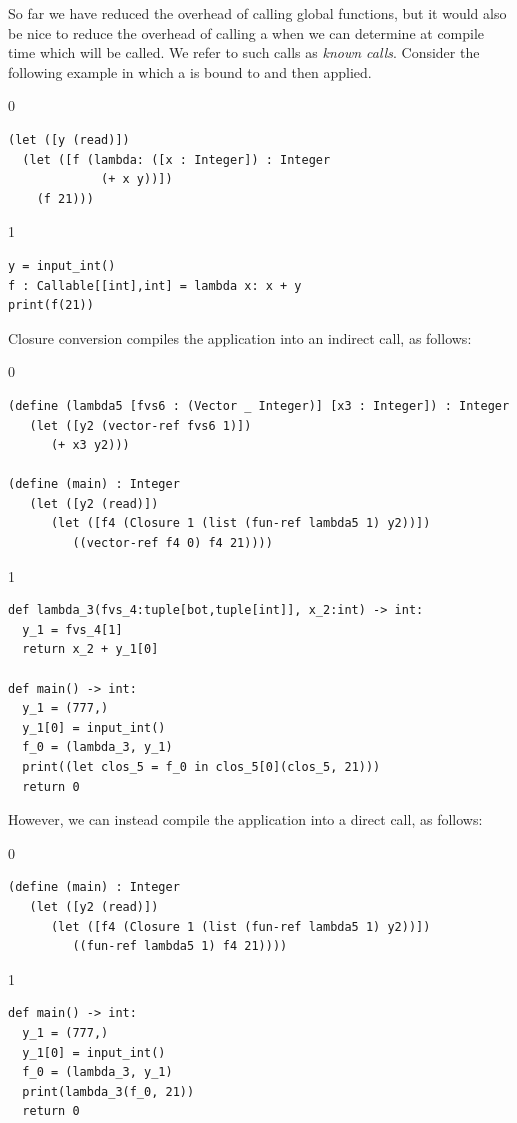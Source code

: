 \documentclass[7x10]{TimesAPriori_MIT}%
\def\racketEd{0}
\def\pythonEd{1}
\def\edition{1}
\newcommand{\pythonColor}[0]{}
\numberwithin{theorem}{chapter}
\numberwithin{definition}{chapter}
\numberwithin{equation}{chapter}
\begin{document}
So far we have reduced the overhead of calling global functions, but
it would also be nice to reduce the overhead of calling a
 when we can determine at compile time which
 will be called. We refer to such calls as \emph{known
  calls}.  Consider the following example in which a  is
bound to  and then applied.
{\if\edition\racketEd
\begin{lstlisting}
(let ([y (read)])
  (let ([f (lambda: ([x : Integer]) : Integer
             (+ x y))])
    (f 21)))
\end{lstlisting}
\fi}
{\if\edition\pythonEd\pythonColor
\begin{lstlisting}
y = input_int()
f : Callable[[int],int] = lambda x: x + y
print(f(21))
\end{lstlisting}
\fi}
%
\noindent Closure conversion compiles the application
 into an indirect call, as follows:
%
{\if\edition\racketEd
\begin{lstlisting}
(define (lambda5 [fvs6 : (Vector _ Integer)] [x3 : Integer]) : Integer
   (let ([y2 (vector-ref fvs6 1)])
      (+ x3 y2)))

(define (main) : Integer
   (let ([y2 (read)])
      (let ([f4 (Closure 1 (list (fun-ref lambda5 1) y2))])
         ((vector-ref f4 0) f4 21))))
\end{lstlisting}
\fi}
{\if\edition\pythonEd\pythonColor
\begin{lstlisting}
def lambda_3(fvs_4:tuple[bot,tuple[int]], x_2:int) -> int:
  y_1 = fvs_4[1]
  return x_2 + y_1[0]

def main() -> int:
  y_1 = (777,)
  y_1[0] = input_int()
  f_0 = (lambda_3, y_1)
  print((let clos_5 = f_0 in clos_5[0](clos_5, 21)))
  return 0
\end{lstlisting}
\fi}
%
\noindent However, we can instead compile the application
 into a direct call, as follows:
%
{\if\edition\racketEd
\begin{lstlisting}
(define (main) : Integer
   (let ([y2 (read)])
      (let ([f4 (Closure 1 (list (fun-ref lambda5 1) y2))])
         ((fun-ref lambda5 1) f4 21))))
\end{lstlisting}
\fi}
{\if\edition\pythonEd\pythonColor
\begin{lstlisting}
def main() -> int:
  y_1 = (777,)
  y_1[0] = input_int()
  f_0 = (lambda_3, y_1)
  print(lambda_3(f_0, 21))
  return 0
\end{lstlisting}
\fi}
\end{document}

